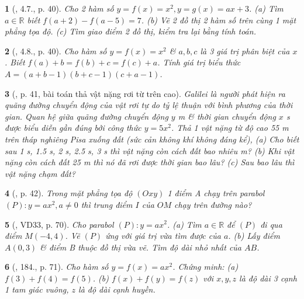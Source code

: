 \documentclass{article}
\newtheorem{baitoan}{}
\begin{document}
\begin{baitoan}[\cite{Binh_boi_duong_Toan_9_tap_2}, 4.7., p. 40]
	Cho 2 hàm số $y = f(x) = x^2,y = g(x) = ax + 3$. (a) Tìm $a\in\mathbb{R}$ biết $f(a + 2) - f(a - 5) = 7$. (b) Vẽ 2 đồ thị 2 hàm số trên cùng 1 mặt phẳng tọa độ. (c) Tìm giao điểm 2 đồ thị, kiểm tra lại bằng tính toán.
\end{baitoan}

\begin{baitoan}[\cite{Binh_boi_duong_Toan_9_tap_2}, 4.8., p. 40]
	Cho hàm số $y = f(x) = x^2$ \& $a,b,c$ là 3 giá trị phân biệt của $x$. Biết $f(a) + b = f(b) + c = f(c) + a$. Tính giá trị biểu thức $A = (a + b - 1)(b + c - 1)(c + a - 1)$.
\end{baitoan}

\begin{baitoan}[\cite{Binh_boi_duong_Toan_9_tap_2}, p. 41, bài toán thả vật nặng rơi từ trên cao]
	Galilei là người phát hiện ra quãng đường chuyển động của vật rơi tự do tỷ lệ thuận với bình phương của thời gian. Quan hệ giữa quãng đường chuyển động $y$ {\rm m} \& thời gian chuyển động $x$ {\rm s} được biểu diễn gần đúng bởi công thức $y = 5x^2$. Thả 1 vật nặng từ độ cao {\rm55 m} trên tháp nghiêng Pisa xuống đất (sức cản không khí không đáng kể), (a) Cho biết sau {\rm1 s, 1.5 s, 2 s, 2.5 s, 3 s} thì vật nặng còn cách đất bao nhiêu {\rm m}? (b) Khi vật nặng còn cách đất {\rm25 m} thì nó đã rơi được thời gian bao lâu? (c) Sau bao lâu thì vật nặng chạm đất?
\end{baitoan}

\begin{baitoan}[\cite{Binh_boi_duong_Toan_9_tap_2}, p. 42]
	Trong mặt phẳng tọa độ $(Oxy)$ 1 điểm A chạy trên parabol $(P):y = ax^2,a\ne0$ thì trung điểm $I$ của $OM$ chạy trên đường nào?
\end{baitoan}

\begin{baitoan}[\cite{Tuyen_Toan_9_old}, VD33, p. 70]
	Cho parabol $(P):y = ax^2$. (a) Tìm $a\in\mathbb{R}$ để $(P)$ đi qua điểm $M(-4,4)$. Vẽ $(P)$ ứng với giá trị vừa tìm được của $a$. (b) Lấy điểm $A(0,3)$ \& điểm B thuộc đồ thị vừa vẽ. Tìm độ dài nhỏ nhất của $AB$.
\end{baitoan}

\begin{baitoan}[\cite{Tuyen_Toan_9_old}, 184., p. 71]
	Cho hàm số $y = f(x) = ax^2$. Chứng minh: (a) $f(3) + f(4) = f(5)$. (b) $f(x) + f(y) = f(z)$ với $x,y,z$ là độ dài 3 cạnh 1 tam giác vuông, $z$ là độ dài cạnh huyền.
\end{baitoan}
\end{document}
